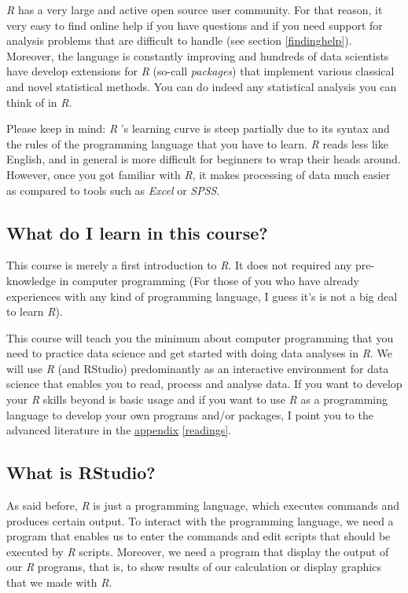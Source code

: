 \documentclass[
]{scrartcl}
\begin{document}
\emph{R} has a very large and active open source user community. For that reason, it very easy to find online help if you have questions and if you need support for analysis problems that are difficult to handle (see section \ref{findinghelp}). Moreover, the language is constantly improving and hundreds of data scientists have develop extensions for \emph{R} (so-call \emph{packages}) that implement various classical and novel statistical methods. You can do indeed any statistical analysis you can think of in \emph{R}.

Please keep in mind: \emph{R} 's learning curve is steep partially due to its syntax and the rules of the programming language that you have to learn. \emph{R} reads less like English, and in general is more difficult for beginners to wrap their heads around. However, once you got familiar with \emph{R}, it makes processing of data much easier as compared to tools such as \emph{Excel} or \emph{SPSS}.

\hypertarget{what-do-i-learn-in-this-course}{%
\subsection{What do I learn in this course?}\label{what-do-i-learn-in-this-course}}

This course is merely a first introduction to \emph{R}. It does not required any pre-knowledge in computer programming (For those of you who have already experiences with any kind of programming language, I guess it's is not a big deal to learn \emph{R}).

This course will teach you the minimum about computer programming that you need to practice data science and get started with doing data analyses in \emph{R}. We will use \emph{R} (and RStudio) predominantly as an interactive environment for data science that enables you to read, process and analyse data. If you want to develop your \emph{R} skills beyond is basic usage and if you want to use \emph{R} as a programming language to develop your own programs and/or packages, I point you to the advanced literature in the \protect\hyperlink{readings}{appendix} \ref{readings}.

\hypertarget{what-is-rstudio}{%
\subsection{What is RStudio?}\label{what-is-rstudio}}

As said before, \emph{R} is just a programming language, which executes commands and produces certain output. To interact with the programming language, we need a program that enables us to enter the commands and edit scripts that should be executed by \emph{R} scripts. Moreover, we need a program that display the output of our \emph{R} programs, that is, to show results of our calculation or display graphics that we made with \emph{R}.
\end{document}
